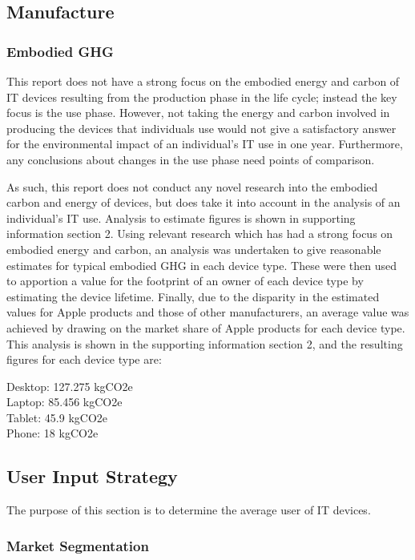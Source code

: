 \documentclass[conference]{IEEEtran}
\begin{document}
\subsection{Manufacture}

\subsubsection{Embodied GHG}

This report does not have a strong focus on the embodied energy and
carbon of IT devices resulting from the production phase in the life
cycle; instead the key focus is the use phase. However, not taking the
energy and carbon involved in producing the devices that individuals
use would not give a satisfactory answer for the environmental impact
of an individual's IT use in one year. Furthermore, any conclusions
about changes in the use phase need points of comparison.

As such, this report does not conduct any novel research into the
embodied carbon and energy of devices, but does take it into account
in the analysis of an individual’s IT use. Analysis to estimate
figures is shown in supporting information section 2. Using relevant
research which has had a strong focus on embodied energy and carbon,
an analysis was undertaken to give reasonable estimates for typical
embodied GHG in each device type. These were then used to apportion a
value for the footprint of an owner of each device type by estimating
the device lifetime. Finally, due to the disparity in the estimated
values for Apple products and those of other manufacturers, an average
value was achieved by drawing on the market share of Apple products
for each device type. This analysis is shown in the supporting
information section 2, and the resulting figures for each device type
are:

Desktop: 127.275 kgCO2e\\
Laptop: 85.456 kgCO2e\\
Tablet: 45.9 kgCO2e\\
Phone: 18 kgCO2e\\

\subsection{User Input Strategy}

The purpose of this section is to determine the average user of IT
devices.

\subsubsection{Market Segmentation}
\end{document}
